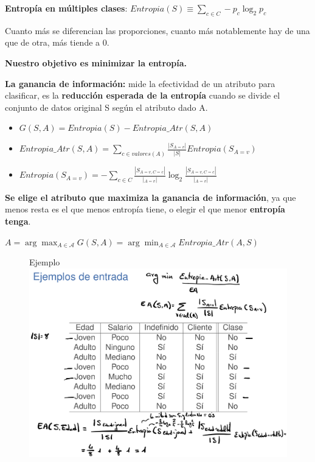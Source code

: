 \documentclass[12pt]{report} %
\begin{document}
\textbf{Entropía en múltiples clases}:
\(Entropia(S) \equiv \sum_{c\in C} -p_c \log _2 p_c\)

Cuanto más se diferencian las proporciones, cuanto más notablemente hay de una que de otra, más tiende a 0.

\textbf{Nuestro objetivo es minimizar la entropía.}

\textbf{La ganancia de información:} mide la efectividad de un atributo
para clasificar, es la \textbf{reducción esperada de la entropía} cuando
se divide el conjunto de datos original S según el atributo dado A.

\begin{itemize}
\item
  \(G(S,A)=Entropia(S) - Entropia\_ Atr(S,A)\)
\item
  \(Entropia\_ Atr(S,A)= \sum_{c \in valores(A)} \frac {|S_{A=v}|}{|S|} Entropia(S_{A=v})\)
\item
  \(Entropia(S_{A=v})= -\sum_{c \in C} \frac {|S_{A=v,C=c}|}{|_{A=v}|} \log_2 \frac {|S_{A=v,C=c}|}{|_{A=v}|}\)
\end{itemize}

\textbf{Se elige el atributo que maximiza la ganancia de información},
ya que menos resta es el que menos entropía tiene, o elegir el que menor
\textbf{entropía tenga}.

\(A= \arg\max_{A \in \mathcal{A}} G(S,A) = \arg\min_{A \in \mathcal{A}} Entropia \_ Atr(A,S)\)


\begin{figure}[H]
	Ejemplo
	{\includegraphics[scale=.15]{Untitled 10.png}}
\end{figure}
\end{document}

